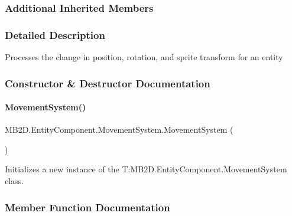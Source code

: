 \subsubsection*{Additional Inherited Members}


\subsubsection{Detailed Description}
Processes the change in position, rotation, and sprite transform for an entity 



\subsubsection{Constructor \& Destructor Documentation}
\hypertarget{class_m_b2_d_1_1_entity_component_1_1_movement_system_a64ad47c34d25ff6a9df2d2d841fc7cfb}{}\label{class_m_b2_d_1_1_entity_component_1_1_movement_system_a64ad47c34d25ff6a9df2d2d841fc7cfb} 
\paragraph{\texorpdfstring{Movement\+System()}{MovementSystem()}}
{\footnotesize\ttfamily M\+B2\+D.\+Entity\+Component.\+Movement\+System.\+Movement\+System (\begin{DoxyParamCaption}{ }\end{DoxyParamCaption})\hspace{0.3cm}{\ttfamily [inline]}}



Initializes a new instance of the T\+:\+M\+B2\+D.\+Entity\+Component.\+Movement\+System class. 



\subsubsection{Member Function Documentation}
\hypertarget{class_m_b2_d_1_1_entity_component_1_1_movement_system_afa730fd9080848ce877206c00a744cdf}{}\label{class_m_b2_d_1_1_entity_component_1_1_movement_system_afa730fd9080848ce877206c00a744cdf} 
